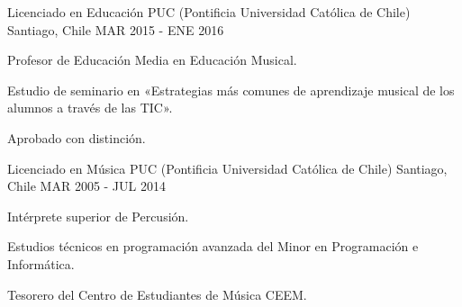 

\begin{cventries}

  \cventry
    {Licenciado en Educación} %
    {PUC (Pontificia Universidad Católica de Chile)} %
    {Santiago, Chile} %
    {MAR 2015 - ENE 2016} %
    {
      \begin{cvitems} %
      	\item {Profesor de Educación Media en Educación Musical.}
        \item {Estudio de seminario en «Estrategias más comunes de aprendizaje musical de los alumnos a través de las TIC».}
        \item {Aprobado con distinción.}
      \end{cvitems}
    }

  \cventry
    {Licenciado en Música} %
    {PUC (Pontificia Universidad Católica de Chile)} %
    {Santiago, Chile} %
    {MAR 2005 - JUL 2014} %
    {
	    \begin{cvitems} %
	     	\item {Intérprete superior de Percusión.}
	     	\item {Estudios técnicos en programación avanzada del Minor en Programación e Informática.}
	     	\item {Tesorero del Centro de Estudiantes de Música CEEM.}
	    \end{cvitems}
    }

\end{cventries}

